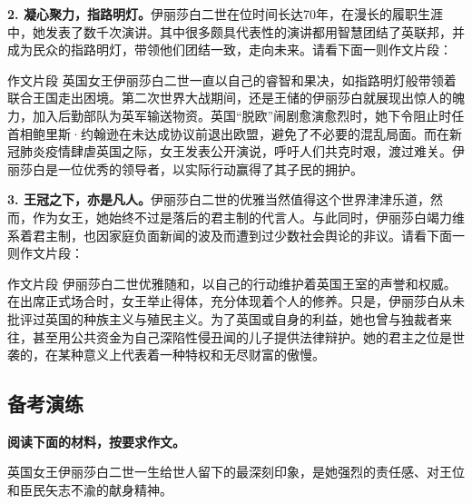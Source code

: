 
\textbf{2. 凝心聚力，指路明灯。}伊丽莎白二世在位时间长达70年，在漫长的履职生涯中，她发表了数千次演讲。其中很多颇具代表性的演讲都用智慧团结了英联邦，并成为民众的指路明灯，带领他们团结一致，走向未来。请看下面一则作文片段：

\begin{quoteBox}{作文片段}
英国女王伊丽莎白二世一直以自己的睿智和果决，如指路明灯般带领着联合王国走出困境。第二次世界大战期间，还是王储的伊丽莎白就展现出惊人的魄力，加入后勤部队为英军输送物资。英国“脱欧”闹剧愈演愈烈时，她下令阻止时任首相鲍里斯·约翰逊在未达成协议前退出欧盟，避免了不必要的混乱局面。而在新冠肺炎疫情肆虐英国之际，女王发表公开演说，呼吁人们共克时艰，渡过难关。伊丽莎白是一位优秀的领导者，以实际行动赢得了其子民的拥护。
\end{quoteBox}


\textbf{3. 王冠之下，亦是凡人。}伊丽莎白二世的优雅当然值得这个世界津津乐道，然而，作为女王，她始终不过是落后的君主制的代言人。与此同时，伊丽莎白竭力维系着君主制，也因家庭负面新闻的波及而遭到过少数社会舆论的非议。请看下面一则作文片段：

\begin{quoteBox}{作文片段}
伊丽莎白二世优雅随和，以自己的行动维护着英国王室的声誉和权威。在出席正式场合时，女王举止得体，充分体现着个人的修养。只是，伊丽莎白从未批评过英国的种族主义与殖民主义。为了英国或自身的利益，她也曾与独裁者来往，甚至用公共资金为自己深陷性侵丑闻的儿子提供法律辩护。她的君主之位是世袭的，在某种意义上代表着一种特权和无尽财富的傲慢。
\end{quoteBox}


\subsection*{备考演练}

\textbf{阅读下面的材料，按要求作文。}

英国女王伊丽莎白二世一生给世人留下的最深刻印象，是她强烈的责任感、对王位和臣民矢志不渝的献身精神。

